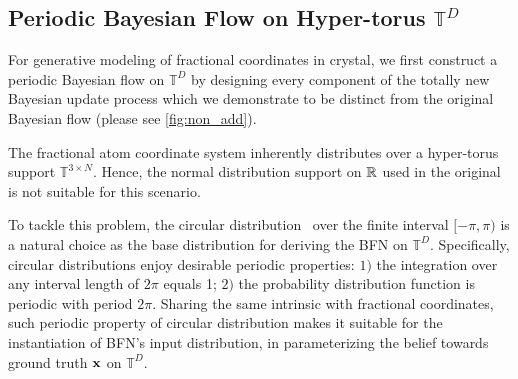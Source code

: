 
\subsection{Periodic Bayesian Flow on Hyper-torus \texorpdfstring{$\mathbb{T}^{D}$}{}} 
For generative modeling of fractional coordinates in crystal, we first construct a periodic Bayesian flow on \texorpdfstring{$\mathbb{T}^{D}$}{} by designing every component of the totally new Bayesian update process which we demonstrate to be distinct from the original Bayesian flow (please see \cref{fig:non_add}). 
 
 The fractional atom coordinate system \citep{jiao2023crystal} inherently distributes over a hyper-torus support $\mathbb{T}^{3\times N}$. Hence, the normal distribution support on $\mathbb{R}$ used in the original \citep{bfn} is not suitable for this scenario. 

To tackle this problem, the circular distribution~\citep{mardia2009directional} over the finite interval $[-\pi,\pi)$ is a natural choice as the base distribution for deriving the BFN on $\mathbb{T}^D$. 
Specifically, circular distributions enjoy desirable periodic properties: $1)$ the integration over any interval length of $2\pi$ equals 1; $2)$ the probability distribution function is periodic with period $2\pi$.  Sharing the same intrinsic with fractional coordinates, such periodic property of circular distribution makes it suitable for the instantiation of BFN's input distribution, in parameterizing the belief towards ground truth $\operatorname{\mathbf{x}}$ on $\mathbb{T}^D$. 

